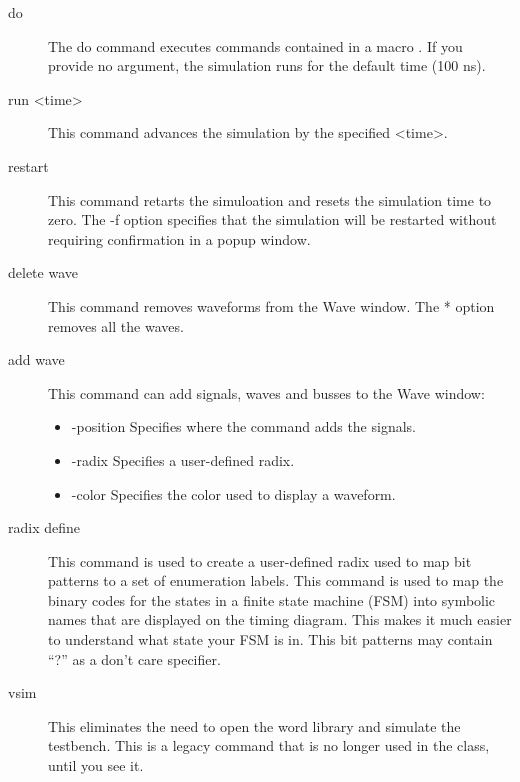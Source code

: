 \begin{description}
\item[do ] The do command executes commands contained in a macro .
If you provide no argument, the simulation runs for the default time (100 ns).

\item[run <time>]This command advances the simulation by the specified <time>.

\item [restart] This command retarts the simuloation and resets the simulation time to zero.
The -f option specifies that the simulation will be restarted without requiring confirmation in a
popup window.

\item[delete wave] This command removes waveforms from the Wave window.  The * option
removes all the waves.

\item[add wave] This command can add signals, waves and busses to the Wave window:
\begin{itemize}
\item -position Specifies where the command adds the signals.
\item  -radix Specifies a user-defined radix.
\item  -color Specifies the color used to display a waveform.
\end{itemize}

\item [radix define] This command is used to create a user-defined radix used to
map bit patterns to a set of enumeration labels.  This command is used to map the
binary codes for the states in a finite state machine (FSM) into symbolic names that are
displayed on the timing diagram.  This makes it much easier to understand what
state your FSM is in.  This bit patterns may contain ``?'' as a don't care specifier.

\item[vsim ] This eliminates the need to open the word library and simulate the testbench.
This is a legacy command that is no longer used in the class, until you see it.


\end{description}

    
    
    
